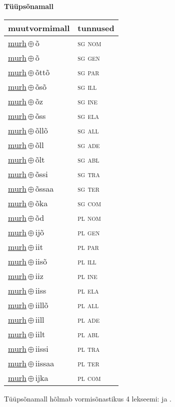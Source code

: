 

\vspace{3.5em}
\noindent \begin{minipage}{\textwidth}
\noindent \textbf{Tüüpsõnamall \,}\\

\begin{sideways}
\begin{tabular}{l l}
muutvormimall & tunnused \\
\hline
\underline{murh}\,$\oplus$\,õ & \textsc{ sg nom } \\
\underline{murh}\,$\oplus$\,õ & \textsc{ sg gen } \\
\underline{murh}\,$\oplus$\,õttõ & \textsc{ sg par } \\
\underline{murh}\,$\oplus$\,õsõ & \textsc{ sg ill } \\
\underline{murh}\,$\oplus$\,õz & \textsc{ sg ine } \\
\underline{murh}\,$\oplus$\,õss & \textsc{ sg ela } \\
\underline{murh}\,$\oplus$\,õllõ & \textsc{ sg all } \\
\underline{murh}\,$\oplus$\,õll & \textsc{ sg ade } \\
\underline{murh}\,$\oplus$\,õlt & \textsc{ sg abl } \\
\underline{murh}\,$\oplus$\,õssi & \textsc{ sg tra } \\
\underline{murh}\,$\oplus$\,õssaa & \textsc{ sg ter } \\
\underline{murh}\,$\oplus$\,õka & \textsc{ sg com } \\
\underline{murh}\,$\oplus$\,õd & \textsc{ pl nom } \\
\underline{murh}\,$\oplus$\,ijõ & \textsc{ pl gen } \\
\underline{murh}\,$\oplus$\,iit & \textsc{ pl par } \\
\underline{murh}\,$\oplus$\,iisõ & \textsc{ pl ill } \\
\underline{murh}\,$\oplus$\,iiz & \textsc{ pl ine } \\
\underline{murh}\,$\oplus$\,iiss & \textsc{ pl ela } \\
\underline{murh}\,$\oplus$\,iillõ & \textsc{ pl all } \\
\underline{murh}\,$\oplus$\,iill & \textsc{ pl ade } \\
\underline{murh}\,$\oplus$\,iilt & \textsc{ pl abl } \\
\underline{murh}\,$\oplus$\,iissi & \textsc{ pl tra } \\
\underline{murh}\,$\oplus$\,iissaa & \textsc{ pl ter } \\
\underline{murh}\,$\oplus$\,ijka & \textsc{ pl com } \\
\end{tabular}
\end{sideways}
\label{tab:tüüpsõnamall-murhõ}

\end{minipage}

 
\vspace{1em}
\noindent Tüüpsõnamall  hõlmab vormisõnastikus 4 lekseemi:  ja .
